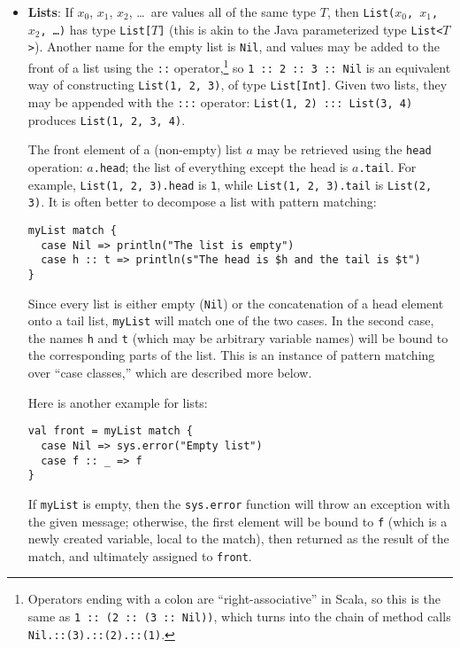 \begin{itemize}
\item \textbf{Lists}: If $x_0$, $x_1$, $x_2$, \ldots\ are values all of the same type $T$, then \texttt{List($x_0$, $x_1$, $x_2$, \ldots)} has type \texttt{List[$T$]} (this is akin to the Java parameterized type \texttt{List<$T$>}). Another name for the empty list is \texttt{Nil}, and values may be added to the front of a list using the \texttt{::} operator,\footnote{Operators ending with a colon are ``right-associative'' in Scala, so this is the same as \texttt{1 ::\ (2 ::\ (3 ::\ Nil))}, which turns into the chain of method calls \texttt{Nil.::(3).::(2).::(1)}.} so \verb|1 :: 2 :: 3 :: Nil| is an equivalent way of constructing \texttt{List(1, 2, 3)}, of type \texttt{List[Int]}. Given two lists, they may be appended with the \texttt{:::} operator: \verb|List(1, 2) ::: List(3, 4)| produces \verb|List(1, 2, 3, 4)|.

The front element of a (non-empty) list $a$ may be retrieved using the \texttt{head} operation: \texttt{$a$.head}; the list of everything except the head is \texttt{$a$.tail}. For example, \texttt{List(1, 2, 3).head} is \texttt{1}, while \texttt{List(1, 2, 3).tail} is \texttt{List(2, 3)}. It is often better to decompose a list with pattern matching:
\begin{verbatim}
myList match {
  case Nil => println("The list is empty")
  case h :: t => println(s"The head is $h and the tail is $t")
}
\end{verbatim}
Since every list is either empty (\texttt{Nil}) or the concatenation of a head element onto a tail list, \texttt{myList} will match one of the two cases. In the second case, the names \texttt{h} and \texttt{t} (which may be arbitrary variable names) will be bound to the corresponding parts of the list. This is an instance of pattern matching over ``case classes,'' which are described more below.

Here is another example for lists:
\begin{verbatim}
val front = myList match {
  case Nil => sys.error("Empty list")
  case f :: _ => f
}
\end{verbatim}
If \texttt{myList} is empty, then the \texttt{sys.error} function will throw an exception with the given message; otherwise, the first element will be bound to \texttt{f} (which is a newly created variable, local to the match), then returned as the result of the match, and ultimately assigned to \texttt{front}.


\end{itemize}
